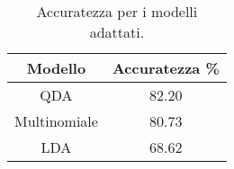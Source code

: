 \begin{table}[H]
\centering
\caption{Accuratezza per i modelli adattati.}
\begin{tabular}{cc}
\toprule
      Modello &  Accuratezza \% \\
\midrule
          QDA &          82.20 \\
 Multinomiale &          80.73 \\
          LDA &          68.62 \\
\bottomrule
\end{tabular}
\label{tab:acc_pen}
\end{table}